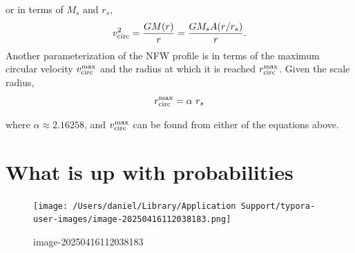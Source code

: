 or in terms of \(M_s\) and \(r_s\), \[
v_{\rm circ}^2 = \frac{G M(r)}{r} = \frac{G M_s A(r/r_s)}{r}.
\] Another parameterization of the NFW profile is in terms of the
maximum circular velocity \(v_{\rm circ}^{\rm max}\) and the radius at
which it is reached \(r_{\rm circ}^{\rm max}\). Given the scale radius,
\[
r_{\rm circ}^{\rm max} = \alpha\ r_s
\]

where \(\alpha\approx2.16258\), and \(v_{\rm circ}^{\rm max}\) can be
found from either of the equations above.

\section{What is up with
probabilities}\label{what-is-up-with-probabilities}

\begin{figure}
\centering
\texttt{[image: /Users/daniel/Library/Application Support/typora-user-images/image-20250416112038183.png]}
\caption{image-20250416112038183}\label{fig:test}
\end{figure}
